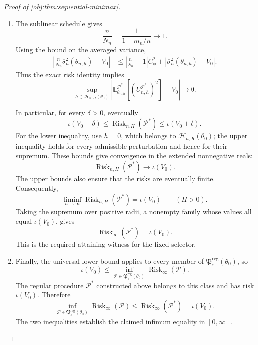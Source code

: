 \documentclass[11pt]{article}
\begin{document}
\begin{proof}[Proof of \cref{obj:thm:sequential-minimax}]
\begin{enumerate}
\item
The sublinear schedule gives
\[
\frac n{N_n}
=
\frac1{1-m_n/n}\longrightarrow1.
\]
Using the bound on the averaged variance,
\[
\begin{aligned}
\left|
\frac n{N_n}\overline\sigma_n^2(\theta_{n,h})-V_0
\right|
&\le
\left|\frac n{N_n}-1\right|C_\phi^2
+
|\overline\sigma_n^2(\theta_{n,h})-V_0|.
\end{aligned}
\]
Thus the exact risk identity implies
\[
\sup_{h\in\mathcal H_{n,H}(\theta_0)}
\left|
\mathbb E_{\theta_{n,h}}^{\mathcal P^*}
[(U_{n,h}^{\mathcal P^*})^2]-V_0
\right|
\longrightarrow0.
\]

In particular, for every \(\delta>0\), eventually
\[
\iota(V_0-\delta)
\le
\operatorname{Risk}_{n,H}(\mathcal P^*)
\le
\iota(V_0+\delta).
\]
For the lower inequality, use \(h=0\), which belongs to
\(\mathcal H_{n,H}(\theta_0)\); the upper inequality holds for every admissible perturbation and hence for their supremum. These bounds give convergence in the extended nonnegative reals:
\[
\operatorname{Risk}_{n,H}(\mathcal P^*)\longrightarrow\iota(V_0).
\]
The upper bounds also ensure that the risks are eventually finite. Consequently,
\[
\liminf_{n\to\infty}\operatorname{Risk}_{n,H}(\mathcal P^*)
=
\iota(V_0)
\qquad(H>0).
\]
Taking the supremum over positive radii, a nonempty family whose values all equal \(\iota(V_0)\), gives
\[
\operatorname{Risk}_{\infty}(\mathcal P^*)=\iota(V_0).
\]
This is the required attaining witness for the fixed selector.

\item
Finally, the universal lower bound applies to every member of
\(\mathfrak P^{\mathrm{reg}}_\varepsilon(\theta_0)\), so
\[
\iota(V_0)
\le
\inf_{\mathcal P\in\mathfrak P^{\mathrm{reg}}_\varepsilon(\theta_0)}
\operatorname{Risk}_{\infty}(\mathcal P).
\]
The regular procedure \(\mathcal P^*\) constructed above belongs to this class and has risk \(\iota(V_0)\). Therefore
\[
\inf_{\mathcal P\in\mathfrak P^{\mathrm{reg}}_\varepsilon(\theta_0)}
\operatorname{Risk}_{\infty}(\mathcal P)
\le
\operatorname{Risk}_{\infty}(\mathcal P^*)
=
\iota(V_0).
\]
The two inequalities establish the claimed infimum equality in \([0,\infty]\).
\end{enumerate}
\end{proof}
\end{document}
